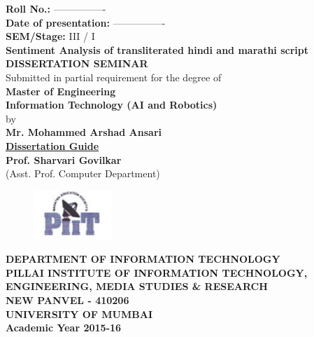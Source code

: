 \documentclass[12pt]{book}
\begin{document}
\thispagestyle{empty}

\begin{center}
    \noindent \hfill \textbf{Roll No.:} ----------------\\
    \noindent \hfill \textbf{Date of presentation:} ----------------\\
    \noindent \hfill \textbf{SEM/Stage:} III / I \\
  	\fontsize{20}{30}\selectfont \textbf{Sentiment Analysis of transliterated
        hindi and marathi script}\\
  	\fontsize{16}{30}\selectfont \textbf{DISSERTATION SEMINAR}\\
  	\fontsize{14}{24}\selectfont Submitted in partial requirement for the degree of\\
  	\fontsize{16}{30}\selectfont \textbf{Master of Engineering}\\
  	\fontsize{14}{30}\selectfont \textbf{Information Technology (AI and Robotics)} \\
  	by\\
  	\textbf{Mr. Mohammed Arshad Ansari}\\
    \textbf{\underline{Dissertation Guide}}\\
  	\textbf{Prof. Sharvari Govilkar}\\
    (Asst. Prof. Computer Department)\\
	\vspace{30mm}
	\begin{figure}[ht!]
	  \centering
	  \includegraphics[width=30mm]{piit.png}
	\end{figure}
  	\fontsize{14}{20}\selectfont \textbf{DEPARTMENT OF INFORMATION TECHNOLOGY\\PILLAI INSTITUTE OF INFORMATION TECHNOLOGY,\\
	ENGINEERING, MEDIA STUDIES \& RESEARCH\\ NEW PANVEL - 410206\\UNIVERSITY OF
    MUMBAI\\Academic Year 2015-16}

\end{center}
\end{document}
